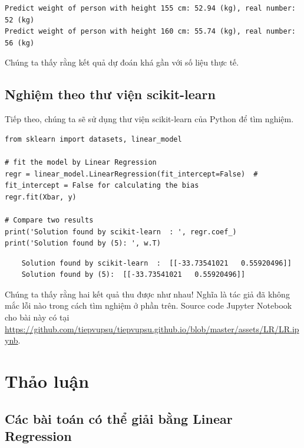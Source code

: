 \documentclass[runningheads]{llncs}
\begin{document}
\noindent\begin{minipage}{\linewidth}\begin{lstlisting}
Predict weight of person with height 155 cm: 52.94 (kg), real number: 52 (kg)
Predict weight of person with height 160 cm: 55.74 (kg), real number: 56 (kg)
\end{lstlisting}\end{minipage}

Chúng ta thấy rằng kết quả dự đoán khá gần với số liệu thực tế.

\subsection{Nghiệm theo thư viện scikit-learn}

Tiếp theo, chúng ta sẽ sử dụng thư viện scikit-learn của Python để tìm nghiệm.

\noindent\begin{minipage}{\linewidth}\begin{lstlisting}
from sklearn import datasets, linear_model

# fit the model by Linear Regression
regr = linear_model.LinearRegression(fit_intercept=False)  # fit_intercept = False for calculating the bias
regr.fit(Xbar, y)

# Compare two results
print('Solution found by scikit-learn  : ', regr.coef_)
print('Solution found by (5): ', w.T)
\end{lstlisting}\end{minipage}

\noindent\begin{minipage}{\linewidth}\begin{lstlisting}
    Solution found by scikit-learn  :  [[-33.73541021   0.55920496]]
    Solution found by (5):  [[-33.73541021   0.55920496]]
\end{lstlisting}\end{minipage}

Chúng ta thấy rằng hai kết quả thu được như nhau! Nghĩa là tác giả đã không
mắc lỗi nào trong cách tìm nghiệm ở phần trên. Source code Jupyter Notebook
cho bài này có tại
\url{https://github.com/tiepvupsu/tiepvupsu.github.io/blob/master/assets/LR/LR.ipynb}.

\section{Thảo luận}

\subsection{Các bài toán có thể giải bằng Linear Regression}
\end{document}
